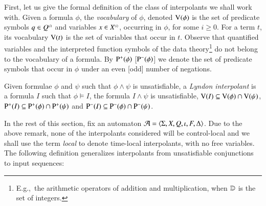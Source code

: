 First, let us give the formal definition of the class of interpolants
we shall work with. Given a formula $\phi$, the \emph{vocabulary} of
$\phi$, denoted $\mathrm{V}({\phi})$ is the set of predicate symbols $q \in
{Q}^{\scriptscriptstyle{({i})}}$ and variables $x \in {X}^{\scriptscriptstyle{({i})}}$, occurring in $\phi$,
for some $i\geq0$. For a term $t$, its vocabulary $\mathrm{V}({t})$ is the set
of variables that occur in $t$. Observe that quantified variables and
the interpreted function symbols of the data
theory\footnote{E.g.,\ the arithmetic operators of addition and
  multiplication, when $\mathbb{D}$ is the set of integers.}  do not belong
to the vocabulary of a formula. By $\mathrm{P}^{+}(\phi)$ [$\mathrm{P}^{-}(\phi)$]
we denote the set of predicate symbols that occur in $\phi$ under an
even [odd] number of negations.

\begin{definition}\label{def:lyndon-interpolant}
Given formulae $\phi$ and $\psi$ such that $\phi \wedge \psi$ is
unsatisfiable, a \emph{Lyndon interpolant} is a formula $I$ such that
$\phi \models I$, the formula $I \wedge \psi$ is unsatisfiable,
$\mathrm{V}({I}) \subseteq \mathrm{V}({\phi}) \cap \mathrm{V}({\psi})$, $\mathrm{P}^{+}(I) \subseteq
\mathrm{P}^{+}(\phi) \cap \mathrm{P}^{+}(\psi)$ and $\mathrm{P}^{-}(I) \subseteq
\mathrm{P}^{-}(\phi) \cap \mathrm{P}^{-}(\psi)$.
\end{definition}

In the rest of this section, fix an automaton $\mathcal{A} =
\langle \Sigma,X,Q,\iota,F,\Delta \rangle$. Due to the above remark, none of
the interpolants considered will be control-local and we shall use the
term \emph{local} to denote time-local interpolants, with no free
variables. The following definition generalizes interpolants from
unsatisfiable conjunctions to input sequences:

